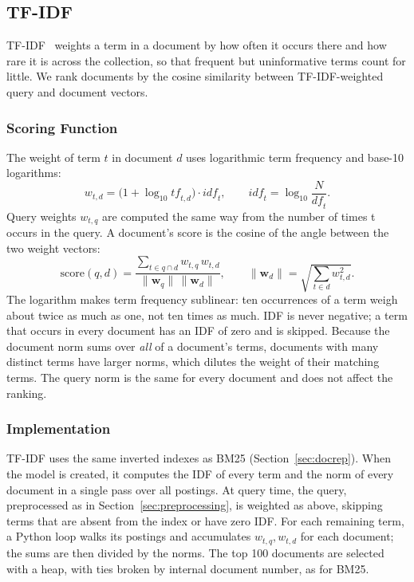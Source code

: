 \documentclass[sigconf,nonacm]{acmart}
\begin{document}
\subsection{TF-IDF}
\label{sec:tfidf}
TF-IDF~\cite[Ch.~6]{manning2008irbook} weights a term in a document by
how often it occurs there and how rare it is across the collection, so
that frequent but uninformative terms count for little. We rank
documents by the cosine similarity between TF-IDF-weighted query and
document vectors.


\subsubsection{Scoring Function}
The weight of term $t$ in document $d$ uses logarithmic term frequency
and base-10 logarithms:
\begin{equation}
  w_{t,d} = \bigl(1 + \log_{10} \mathit{tf}_{t,d}\bigr) \cdot \mathit{idf}_t,
  \qquad
  \mathit{idf}_t = \log_{10} \frac{N}{\mathit{df}_t}.
  \label{eq:tfidf-weight}
\end{equation}
Query weights $w_{t,q}$ are computed the same way from the number of
times t occurs in the query. A document's score is the cosine of the
angle between the two weight vectors:
\begin{equation}
  \mathrm{score}(q,d) =
    \frac{\sum_{t \in q \cap d} w_{t,q}\, w_{t,d}}
         {\lVert \mathbf{w}_q \rVert \, \lVert \mathbf{w}_d \rVert},
  \qquad
  \lVert \mathbf{w}_d \rVert = \sqrt{\textstyle\sum_{t \in d} w_{t,d}^2}.
  \label{eq:cosine}
\end{equation}
The logarithm makes term frequency sublinear: ten occurrences of a term
weigh about twice as much as one, not ten times as much. IDF is never
negative; a term that occurs in every document has an IDF of zero and is
skipped. Because the document norm sums over \emph{all} of a document's
terms, documents with many distinct terms have larger norms, which
dilutes the weight of their matching terms. The query norm is the same
for every document and does not affect the ranking.


\subsubsection{Implementation}
TF-IDF uses the same inverted indexes as BM25
(Section~\ref{sec:docrep}). When the model is created, it computes the
IDF of every term and the norm of every document in a single pass over
all postings. At query time, the query, preprocessed as in
Section~\ref{sec:preprocessing}, is weighted as above, skipping terms
that are absent from the index or have zero IDF. For each remaining
term, a Python loop walks its postings and accumulates
$w_{t,q}, w_{t,d}$ for each document; the sums are then divided by the
norms. The top 100 documents are selected with a heap, with ties broken
by internal document number, as for BM25.
\end{document}
